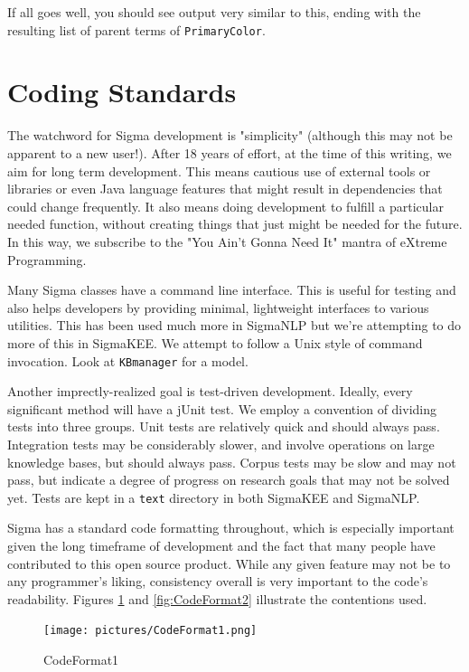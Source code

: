 \documentclass{book}
\begin{document}
If all goes well, you should see output very similar to this, ending with the resulting
list of parent terms of \texttt{PrimaryColor}.

\section{Coding Standards}

The watchword for Sigma development is "simplicity" (although this may not be
apparent to a new user!). After 18 years of effort, at the time of this writing,
we aim for long term development.  This means cautious use of external tools or
libraries or even Java language features that might result in dependencies that
could change frequently.  It also means doing development to fulfill a particular
needed function, without creating things that just might be needed for the future.
In this way, we subscribe to the "You Ain't Gonna Need It" mantra of eXtreme
Programming.

Many Sigma classes have a command line interface.  This is useful for testing and
also helps developers by providing minimal, lightweight interfaces to various
utilities.  This has been used much more in SigmaNLP but we're attempting to do
more of this in SigmaKEE.  We attempt to follow a Unix style of command invocation.
Look at \texttt{KBmanager} for a model.

Another imprectly-realized goal is test-driven development.  Ideally, every significant
method will have a jUnit test.  We employ a convention of dividing tests into
three groups.  Unit tests are relatively quick and should always pass.
Integration tests may be considerably slower, and involve operations on large knowledge
bases, but should always pass.  Corpus tests may be slow and may not pass, but indicate
a degree of progress on research goals that may not be solved yet.  Tests are
kept in a \texttt{text} directory in both SigmaKEE and SigmaNLP.

Sigma has a standard code formatting throughout, which is especially important
given the long timeframe of development and the fact that many people have
contributed to this open source product.  While any given feature may not be to
any programmer's liking, consistency overall is very important to the code's
readability.  Figures \ref{fig:CodeFormat1} and \ref{fig:CodeFormat2} illustrate
the contentions used.

\begin{figure}
  \centering
  \texttt{[image: pictures/CodeFormat1.png]}
  \caption{CodeFormat1}
  \label{fig:CodeFormat1}
\end{figure}
\end{document}
